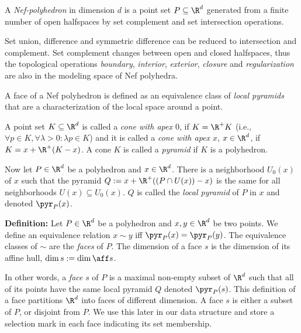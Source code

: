 \vspace{2ex}{\bf Definition:}\quad
    A \emph{Nef-poly\-he\-dron} in dimension $d$ is a point set $P \subseteq
    \R^d$ generated from a finite number of open halfspaces by set
    complement and set intersection operations.
\vspace{2ex}

Set union, difference and symmetric difference can be reduced to
intersection and complement. Set complement changes between open
and closed halfspaces, thus the topological operations \emph{boundary},
\emph{interior}, \emph{exterior}, \emph{closure} and {\em
regularization} are also in the modeling space of Nef polyhedra.

A face of a Nef polyhedron is defined as an equivalence class of
\emph{local pyramids} that are a characterization of the local space
around a point.

\vspace{2ex}{\bf Definition:}\quad
    A point set $K \subseteq \R^d$ is called a \emph{cone with apex $0$},
    if $K = \R^{+} K$ (i.e., $\forall p \in K, \forall \lambda > 0: \lambda p
    \in K$) and it is called a \emph{cone with apex $x$}, $x \in \R^d$,
    if $K = x + \R^{+} (K - x)$. A cone $K$ is called a \emph{pyramid}
    if $K$ is a polyhedron.

    Now let $P \in \R^d$ be a polyhedron and $x \in \R^d$. There is a 
    neighborhood $U_0(x)$ of $x$ such that the pyramid $Q := x + \R^{+} 
    ((P \cap U(x)) - x)$ is the same for all neighborhoods $U(x) \subseteq
    U_0(x)$. $Q$ is called the \emph{local pyramid} of $P$ in $x$ and
    denoted $\pyr_P(x)$. 
\vspace{2ex}

{\bf Definition:}\quad
    Let $P \in \R^d$ be a polyhedron and $x, y \in \R^d$ be two points.
    We define an equivalence relation $x \sim y$ iff
    $\pyr_P(x) = \pyr_P(y)$. The equivalence classes of $\sim$ 
    are the \emph{faces} of $P$. The dimension of a face $s$ is the  
    dimension of its affine hull, $\dim s := \dim \aff s$.
\vspace{2ex}

In other words, a \emph{face} $s$ of $P$ is a maximal non-empty subset
of $\R^d$ such that all of its points have the same local pyramid $Q$
denoted $\pyr_P(s)$.  This definition of a face partitions $\R^d$ into
faces of different dimension. A face $s$ is either a subset of $P$, or
disjoint from $P$.  We use this later in our data structure and store
a selection mark in each face indicating its set membership.

